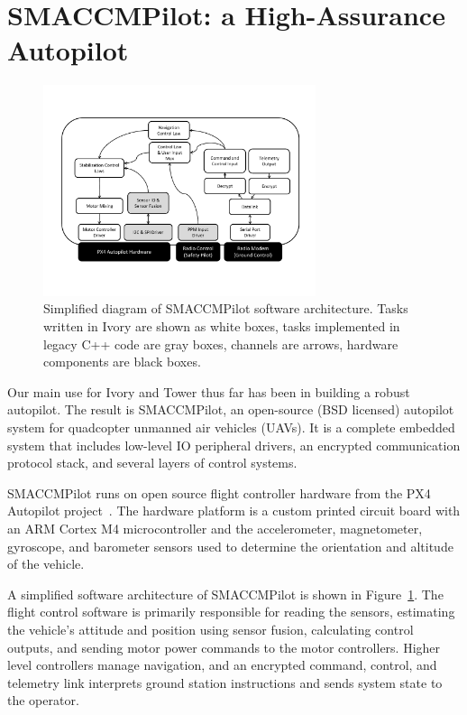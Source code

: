 \section{SMACCMPilot: a High-Assurance Autopilot}
\label{sec:smaccmpilot}

\begin{figure}[ht!]
  \begin{center}
\includegraphics[width=8cm]{figures/smaccmpilot-diagram-jan14}
  \end{center}
\caption[SMACCMPilot software architecture]{
Simplified diagram of SMACCMPilot
software architecture. Tasks written in Ivory are shown as white boxes,
tasks implemented in legacy C++ code are gray boxes,
channels are arrows,
hardware components are black boxes.}
\label{fig:smaccmpilotSwArch}
\end{figure}

Our main use for Ivory and Tower thus far has been in building a robust
autopilot. The result is SMACCMPilot, an open-source (BSD licensed) autopilot
system for quadcopter unmanned air vehicles (UAVs).  It is a complete embedded
system that includes low-level IO
peripheral drivers, an encrypted communication protocol stack, and several
layers of control systems.

SMACCMPilot runs on open source flight controller hardware from the PX4
Autopilot project~\cite{px4-proj}. The hardware platform is
a custom printed circuit board with an ARM Cortex M4 microcontroller and the
accelerometer, magnetometer, gyroscope, and barometer sensors used to
determine the orientation and altitude of the vehicle.

A simplified software architecture of SMACCMPilot is shown in
Figure~\ref{fig:smaccmpilotSwArch}.
The flight control software is primarily responsible for reading the sensors,
estimating the vehicle's attitude and position using sensor fusion, calculating
control outputs, and sending motor power commands to the motor controllers.
Higher level controllers manage navigation, and an encrypted command, control,
and telemetry link interprets ground station instructions and sends system state
to the operator.


